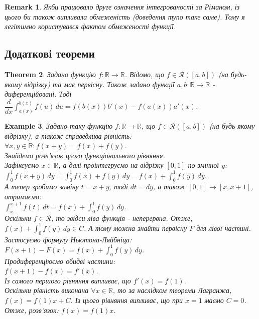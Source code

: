 \documentclass[a4paper, 10pt]{article}
\def\huge{\displaystyle}
\theoremstyle{theoremdd}
\newtheorem{theorem}{Theorem}[subsection]
\theoremstyle{theoremdd}
\theoremstyle{theoremdd}
\theoremstyle{theoremdd}
\theoremstyle{theoremdd}
\newtheorem{example}[theorem]{Example}
\theoremstyle{theoremdd}
\theoremstyle{theoremdd}
\newtheorem{remark}[theorem]{Remark}
\theoremstyle{theoremdd}
\theoremstyle{theoremdd}
\begin{document}
\begin{remark}
Якби працювало друге означення інтегрованості за Ріманом, із цього би також випливала обмеженість (доведення тупо таке саме). Тому я легітимно користувався фактом обмеженості функції.
\end{remark}

\iffalse
\subsection{Додаткові теореми}
\begin{theorem}
Задано функцію $f: \mathbb{R} \to \mathbb{R}$. Відомо, що $f \in \mathcal{R}([a,b])$ (на будь-якому відрізку) та має первісну. Також задано функції $a,b: \mathbb{R} \to \mathbb{R}$ - диференційовані. Тоді\\
$\dfrac{d}{dx} \huge\int_{a(x)}^{b(x)}f(u)\,du = f(b(x))b'(x) - f(a(x))a'(x)$.
\end{theorem}

\begin{example}
Задано таку функцію $f: \mathbb{R} \to \mathbb{R}$, що $f \in \mathcal{R}([a,b])$ (на будь-якому відрізку), а також справедлива рівність:\\
$\forall x,y \in \mathbb{R}: f(x+y) = f(x) + f(y)$.\\
Знайдемо розв'язок цього функціонального рівняння.\\
Зафіксуємо $x \in \mathbb{R}$, а далі проінтегруємо на відрізку $[0,1]$ по змінної $y$:\\
$\huge\int_0^1 f(x+y)\,dy = \int_0^1 f(x)+f(y)\,dy = f(x) + \int_0^1 f(y)\,dy$.\\
А тепер зробимо заміну $t = x+y$, тоді $dt = dy$, а також $[0,1] \to [x,x+1]$, отримаємо:\\
$\huge\int_x^{x+1} f(t)\,dt = f(x) + \int_0^1 f(y)\,dy$.\\
Оскільки $f \in \mathcal{R}$, то звідси ліва функція - неперервна. Отже, $\huge f(x) + \int_0^1 f(y)\,dy \in C$. А тому можна знайти первісну $F$ для лівої частині. Застосуємо формулу Ньютона-Ляйбніца:\\
$F(x+1) - F(x) = f(x) + \huge\int_0^1 f(y)\,dy$.\\
Продиференціюємо обидві частини:\\
$f(x+1) - f(x) = f'(x)$.\\
Із самого першого рівняння випливає, що $f'(x) = f(1)$.\\
Оскільки рівність виконана $\forall x \in \mathbb{R}$, то за наслідком теореми Лагранжа, $f(x) = f(1)x + C$. Із цього рівняння випливає, що при $x = 1$ маємо $C = 0$.\\
Отже, розв'язок: $f(x) = f(1)x$.
\end{example}
\end{document}
